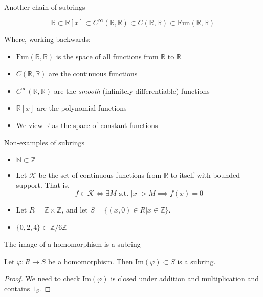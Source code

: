 \documentclass{beamer}
\newcommand{\Z}{\mathbb{Z}}
\begin{document}
\begin{frame}{Another chain of subrings}

$$\mathbb{R}\subset \mathbb{R}[x]\subset C^\infty(\mathbb{R},\mathbb{R})\subset C(\mathbb{R},\mathbb{R}) \subset \textrm{Fun}(\mathbb{R},\mathbb{R})$$

Where, working backwards:
\begin{itemize}
\item $\textrm{Fun}(\mathbb{R},\mathbb{R})$ is the space of all functions from $\mathbb{R}$ to $\mathbb{R}$
\item $C(\mathbb{R},\mathbb{R})$ are the continuous functions
\item $C^\infty(\mathbb{R},\mathbb{R})$ are the \emph{smooth} (infinitely differentiable) functions
\item $\mathbb{R}[x]$ are the polynomial functions
\item We view $\mathbb{R}$ as the space of constant functions 
\end{itemize}

\end{frame}


\begin{frame}{Non-examples of subrings}

\begin{itemize}
\item $\mathbb{N}\subset\mathbb{Z}$ 
\item Let $\mathcal{K}$ be the set of continuous functions from $\mathbb{R}$ to itself with bounded support.  That is,
$$f\in \mathcal{K} \iff \exists M \textrm{ s.t. } |x|>M\implies  f(x)=0 $$
\item Let $R=\mathbb{Z}\times \mathbb{Z}$, and let $S=\{(x,0)\in R | x\in \mathbb{Z}\}$.  
\item $\{0,2,4\}\subset\Z/6\Z$
\end{itemize}
\end{frame}

\begin{frame}{The image of a homomorphism is a subring}

\begin{lemma} Let $\varphi:R\to S$ be a homomorphism.  Then $\textrm{Im}(\varphi)\subset S$ is a subring.
\end{lemma}

\begin{proof}
We need to check $\textrm{Im}(\varphi)$ is closed under addition and multiplication and contains $1_S$.
\end{proof}

\end{frame}
\end{document}
